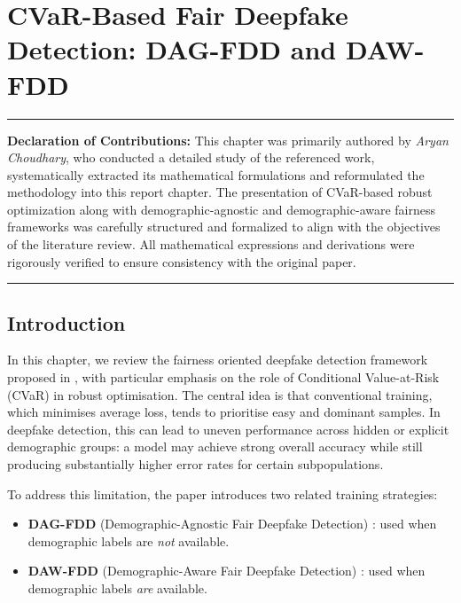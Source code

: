 
\chapter{CVaR-Based Fair Deepfake Detection: DAG-FDD and DAW-FDD}
\label{ch:cvar_deepfake}



\vspace{0.5em}
\noindent\rule{\textwidth}{0.4pt}
\textbf{Declaration of Contributions:} This chapter was primarily authored by \textit{Aryan Choudhary}, who conducted a detailed study of the referenced work, systematically extracted its mathematical formulations and reformulated the methodology into this report chapter. The presentation of CVaR-based robust optimization along with demographic-agnostic and demographic-aware fairness frameworks was carefully structured and formalized to align with the objectives of the literature review. All mathematical expressions and derivations were rigorously verified to ensure consistency with the original paper.
\noindent\rule{\textwidth}{0.4pt}
\vspace{1em}

\bigskip
\section{Introduction}
\label{sec:ch4_intro}

In this chapter, we review the fairness oriented deepfake detection framework proposed in \cite{dag_paper}, with particular emphasis on the role of Conditional Value-at-Risk (CVaR) in robust optimisation. The central idea is that conventional training, which minimises average loss, tends to prioritise easy and dominant samples. In deepfake detection, this can lead to uneven performance across hidden or explicit demographic groups: a model may achieve strong overall accuracy while still producing substantially higher error rates for certain subpopulations.

To address this limitation, the paper introduces two related training strategies:

\begin{itemize}
    \item \textbf{DAG-FDD} (Demographic-Agnostic Fair Deepfake Detection) : used when demographic labels are \emph{not} available.
    \item \textbf{DAW-FDD} (Demographic-Aware Fair Deepfake Detection) : used when demographic labels \emph{are} available.
\end{itemize}

